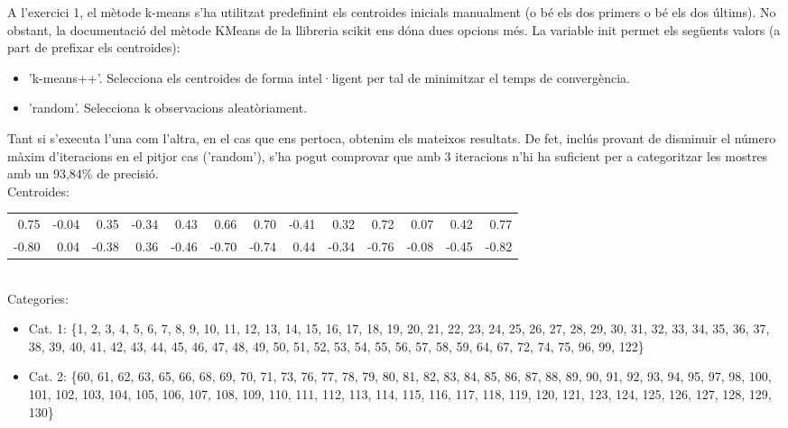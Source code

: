 \documentclass{article} %
\begin{document}
{\color{blue}
	A l'exercici 1, el mètode k-means s'ha utilitzat predefinint els centroides inicials manualment (o bé els dos primers o bé els dos últims). No obstant, la documentació del mètode KMeans de la llibreria scikit ens dóna dues opcions més. La variable init permet els següents valors (a part de prefixar els centroides):
	\begin{itemize}
		\item 'k-means++'. Selecciona els centroides de forma intel·ligent per tal de minimitzar el temps de convergència.
		\item 'random'. Selecciona k observacions aleatòriament.
	\end{itemize}

	Tant si s'executa l'una com l'altra, en el cas que ens pertoca, obtenim els mateixos resultats. De fet, inclús provant de disminuir el número màxim d'iteracions en el pitjor cas ('random'), s'ha pogut comprovar que amb 3 iteracions n'hi ha suficient per a categoritzar les mostres amb un 93,84\% de precisió. \\

	Centroides: \\

	{\selectfont\tiny
	\begin{tabular}{r r r r r r r r r r r r r}
		0.75 & -0.04 & 0.35 & -0.34 & 0.43 & 0.66& 0.70 & -0.41 & 0.32 & 0.72 & 0.07 & 0.42 & 0.77 \\
		-0.80 & 0.04 & -0.38 & 0.36 & -0.46 & -0.70 & -0.74 & 0.44 & -0.34 & -0.76 & -0.08 & -0.45 & -0.82 \\
	\end{tabular}
	} \\

	Categories:

	\begin{itemize}
		\item[] Cat. 1: \{1, 2, 3, 4, 5, 6, 7, 8, 9, 10, 11, 12, 13, 14, 15, 16, 17, 18, 19, 20, 21, 22, 23, 24, 25, 26, 27, 28, 29, 30, 31, 32, 33, 34, 35, 36, 37, 38, 39, 40, 41, 42, 43, 44, 45, 46, 47, 48, 49, 50, 51, 52, 53, 54, 55, 56, 57, 58, 59, 64, 67, 72, 74, 75, 96, 99, 122\}
		\item[] Cat. 2: \{60, 61, 62, 63, 65, 66, 68, 69, 70, 71, 73, 76, 77, 78, 79, 80, 81, 82, 83, 84, 85, 86, 87, 88, 89, 90, 91, 92, 93, 94, 95, 97, 98, 100, 101, 102, 103, 104, 105, 106, 107, 108, 109, 110, 111, 112, 113, 114, 115, 116, 117, 118, 119, 120, 121, 123, 124, 125, 126, 127, 128, 129, 130\}
	\end{itemize}

}
\end{document}
